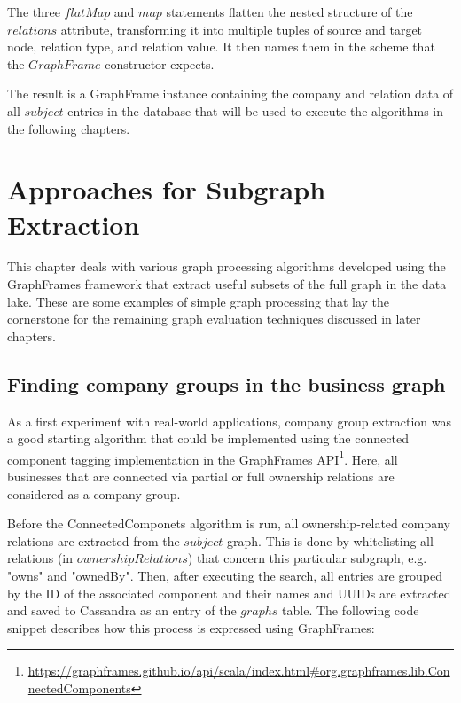 \documentclass[
        a4paper,     %
        titlepage,   %
        oneside,     %
        parskip      %
]{scrartcl}          %
\begin{document}
    The three $flatMap$ and $map$ statements flatten the nested structure of the $relations$ attribute,
    transforming it into multiple tuples of source and target node, relation type, and relation value.
    It then names them in the scheme that the $GraphFrame$ constructor expects.

    The result is a GraphFrame instance containing the company and relation data of all $subject$
    entries in the database that will be used to execute the algorithms in the following chapters.
    \pagebreak

  \section{Approaches for Subgraph Extraction}
  \label{sec:subgraph_extraction}
  This chapter deals with various graph processing algorithms developed using the
  GraphFrames framework that extract useful subsets of the full graph in the data lake.
  These are some examples of simple graph processing that lay the cornerstone
  for the remaining graph evaluation techniques discussed in later chapters.

  \subsection{Finding company groups in the business graph}
  \label{sec:company_groups}
  As a first experiment with real-world applications, company group extraction
  was a good starting algorithm that could be implemented using the connected component
  tagging implementation in the GraphFrames
  API\footnote{\url{https://graphframes.github.io/api/scala/index.html\#org.graphframes.lib.ConnectedComponents}}.
  Here, all businesses that are connected via partial or full ownership
  relations are considered as a company group.

  Before the ConnectedComponets algorithm is run, all ownership-related company
  relations are extracted from the $subject$ graph. This is done by whitelisting
  all relations (in $ownershipRelations$) that concern this particular subgraph,
  e.g. "owns" and "ownedBy".
  Then, after executing the search, all entries are grouped by the ID of the
  associated component and their names and UUIDs are extracted and saved to Cassandra
  as an entry of the $graphs$ table. The following code snippet describes how
  this process is expressed using GraphFrames:
\end{document}
